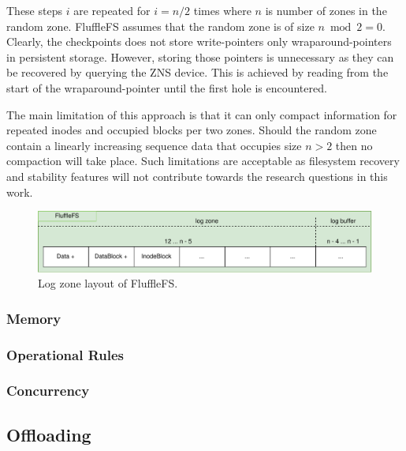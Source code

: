 These steps $i$ are repeated for $i = n/2$ times where $n$ is number of zones in
the random zone. FluffleFS assumes that the random zone is of size
$n \bmod 2 = 0$. Clearly, the checkpoints does not store write-pointers only
wraparound-pointers in persistent storage. However, storing those pointers is
unnecessary as they can be recovered by querying the ZNS device. This is
achieved by reading from the start of the wraparound-pointer until the first
hole is encountered.

The main limitation of this approach is that it can only compact information
for repeated inodes and occupied blocks per two zones. Should the random zone
contain a linearly increasing sequence data that occupies size $n > 2$ then no
compaction will take place. Such limitations are acceptable as filesystem
recovery and stability features will not contribute towards the research
questions in this work.

\begin{figure}[h!]
    \centering
	\includegraphics[width=1\textwidth]{resources/images/fluffle-layout-log.pdf}
	\caption{Log zone layout of FluffleFS.}
    \label{figure:flufflelayoutlog}
\end{figure}

\subsubsection{Memory}

\subsubsection{Operational Rules}

\subsubsection{Concurrency}

\subsection{Offloading}


